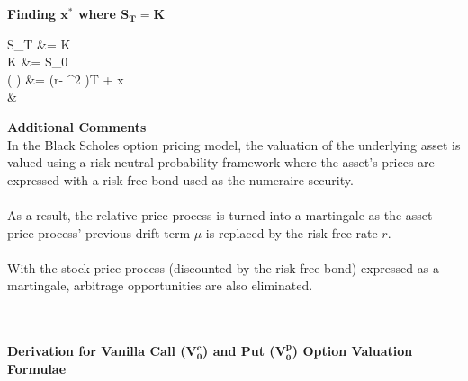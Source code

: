 \documentclass{article}
\begin{document}
\begin{minipage}[t]{0.5\textwidth}
	\begin{tcolorbox}[height=11.5cm,boxsep=5pt,arc=0pt,auto outer arc,colback=white,colframe=black]
		\noindent \textbf{Finding $\boldsymbol{x^*}$ where $\boldsymbol{S_T=K}$}
		\begin{flalign*}
		S_T &= K\\
		K &= S_0 \exp{}\\
		\log \left(  \right) &= \left(r- \sigma^2 \right)T + \sigma {} x\\
		&
		\end{flalign*}
		\noindent \textbf{Additional Comments}\\ 
		In the Black Scholes option pricing model, the valuation of the underlying asset is valued using a risk-neutral probability framework where the asset's prices are expressed  with a risk-free bond used as the numeraire security. \\ \\
	    As a result, the relative price process is turned into a martingale as the asset price process' previous drift term $\mu$ is replaced by the risk-free rate $r$.\\ \\
		With the stock price process (discounted by the risk-free bond) expressed as a martingale, arbitrage opportunities are also eliminated.
	\end{tcolorbox}
\end{minipage} \\ \\
\noindent \textbf{Derivation for Vanilla Call ($\boldsymbol{V_0^c}$) and Put ($\boldsymbol{V_0^p}$) Option Valuation Formulae}
\end{document}
